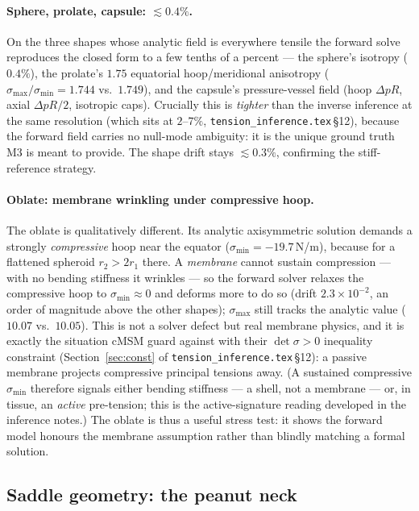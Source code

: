 \documentclass[11pt]{article}
\begin{document}
\paragraph{Sphere, prolate, capsule: $\lesssim0.4\%$.} On the three shapes whose analytic field is
everywhere tensile the forward solve reproduces the closed form to a few tenths of a percent ---
the sphere's isotropy ($0.4\%$), the prolate's $1.75$ equatorial hoop/meridional anisotropy
($\sigma_{\max}/\sigma_{\min}=1.744$ vs.\ $1.749$), and the capsule's pressure-vessel field (hoop
$\Delta pR$, axial $\Delta pR/2$, isotropic caps). Crucially this is \emph{tighter} than the inverse
inference at the same resolution (which sits at $2$--$7\%$, \texttt{tension\_inference.tex}\,\S12),
because the forward field carries no null-mode ambiguity: it is the unique ground truth M3 is meant
to provide. The shape drift stays $\lesssim0.3\%$, confirming the stiff-reference strategy.

\paragraph{Oblate: membrane wrinkling under compressive hoop.} The oblate is qualitatively
different. Its analytic axisymmetric solution demands a strongly \emph{compressive} hoop near the
equator ($\sigma_{\min}=-19.7$\,N/m), because for a flattened spheroid $r_2>2r_1$ there. A
\emph{membrane} cannot sustain compression --- with no bending stiffness it wrinkles --- so the
forward solver relaxes the compressive hoop to $\sigma_{\min}\approx0$ and deforms more to do so
(drift $2.3\times10^{-2}$, an order of magnitude above the other shapes); $\sigma_{\max}$ still
tracks the analytic value ($10.07$ vs.\ $10.05$). This is not a solver defect but real membrane
physics, and it is exactly the situation cMSM guard against with their $\det\sigma>0$ inequality
constraint (Section~\ref{sec:const} of \texttt{tension\_inference.tex}\,\S12): a passive membrane
projects compressive principal tensions away. (A sustained compressive $\sigma_{\min}$ therefore
signals either bending stiffness --- a shell, not a membrane --- or, in tissue, an \emph{active}
pre-tension; this is the active-signature reading developed in the inference notes.) The oblate is
thus a useful stress test: it shows the forward model honours the membrane assumption rather than
blindly matching a formal solution.

\subsection{Saddle geometry: the peanut neck}
\label{sec:peanut}
\end{document}

